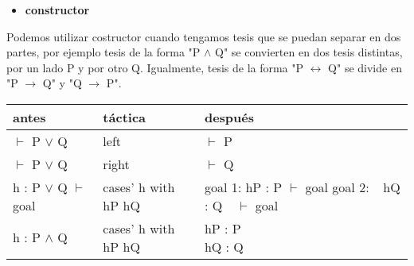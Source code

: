 \documentclass{article}
\begin{document}
\begin{itemize}
    \item \textbf{constructor}
\end{itemize}

Podemos utilizar costructor cuando tengamos tesis que se puedan separar en dos partes, por ejemplo tesis de la forma "P $\land$ Q" se convierten en dos tesis distintas, por un lado P y por otro Q. Igualmente, tesis de la forma "P $\leftrightarrow$ Q" se divide en "P $\rightarrow$ Q" y "Q $\rightarrow$ P".


\begin{center}
\begin{tabular}{ | m{8em} | m{8em}| m{8em} | } 
  \hline
  \textbf{antes} & \textbf{táctica} & \textbf{después} \\
  \hline
  $\vdash$ P $\lor$ Q & left & $\vdash$ P \\
  \hline
  $\vdash$ P $\lor$ Q & right & $\vdash$ Q \\
  \hline
  \parbox{8em}{h : P $\lor$ Q \\ $\vdash$ goal} & cases' h with hP hQ & \parbox{8em}{goal 1: \\ hP : P \\ $\vdash$ goal \\[1ex] goal 2: \\ $~~$ hQ : Q \\ $~~$ $\vdash$ goal} \\
  \hline
  h : P $\land$ Q & cases' h with hP hQ & \parbox{8em}{hP : P \\ hQ : Q }\\
  \hline
  
\end{tabular}
\end{center}




\end{document}
